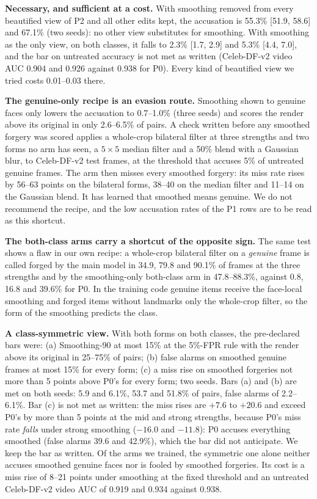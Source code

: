 \documentclass[conference]{IEEEtran}
\begin{document}
\textbf{Necessary, and sufficient at a cost.} With smoothing removed from every beautified view of P2 and all other
edits kept, the accusation is 55.3\% [51.9, 58.6] and 67.1\% (two seeds): no other view substitutes for smoothing. With
smoothing as the only view, on both classes, it falls to 2.3\% [1.7, 2.9] and 5.3\% [4.4, 7.0], and the bar on
untreated accuracy is not met as written (Celeb-DF-v2 video AUC 0.904 and 0.926 against 0.938 for P0). Every kind of
beautified view we tried costs 0.01--0.03 there.

\textbf{The genuine-only recipe is an evasion route.} Smoothing shown to genuine faces only lowers the accusation to
0.7--1.0\% (three seeds) and scores the render above its original in only 2.6--6.5\% of pairs. A check written before
any smoothed forgery was scored applies a whole-crop bilateral filter at three strengths and two forms no arm has seen,
a $5\times5$ median filter and a 50\% blend with a Gaussian blur, to Celeb-DF-v2 test frames, at the threshold that
accuses 5\% of untreated genuine frames. The arm then misses every smoothed forgery: its miss rate rises by 56--63
points on the bilateral forms, 38--40 on the median filter and 11--14 on the Gaussian blend. It has learned that
smoothed means genuine. We do not recommend the recipe, and the low accusation rates of the P1 rows are to be read as
this shortcut.

\textbf{The both-class arms carry a shortcut of the opposite sign.} The same test shows a flaw in our own recipe: a
whole-crop bilateral filter on a \emph{genuine} frame is called forged by the main model in 34.9, 79.8 and 90.1\% of
frames at the three strengths and by the smoothing-only both-class arm in 47.8--88.3\%, against 0.8, 16.8 and 39.6\%
for P0. In the training code genuine items receive the face-local smoothing and forged items without landmarks
only the whole-crop filter, so the form of the smoothing predicts the class.

\textbf{A class-symmetric view.} With both forms on both classes, the pre-declared bars were: (a) Smoothing-90 at most
15\% at the 5\%-FPR rule with the render above its original in 25--75\% of pairs; (b) false alarms on smoothed genuine
frames at most 15\% for every form; (c) a miss rise on smoothed forgeries not more than 5 points above P0's for every
form; two seeds. Bars (a) and (b) are met on both seeds: 5.9 and 6.1\%, 53.7 and 51.8\% of pairs, false alarms of
2.2--6.1\%. Bar (c) is not met as written: the miss rises are $+7.6$ to $+20.6$ and exceed P0's by more than 5 points
at the mid and strong strengths, because P0's miss rate \emph{falls} under strong smoothing ($-16.0$ and $-11.8$): P0
accuses everything smoothed (false alarms 39.6 and 42.9\%), which the bar did not anticipate. We keep the bar as
written. Of the arms we trained, the symmetric one alone neither accuses smoothed genuine faces nor is fooled by
smoothed forgeries. Its cost is a miss rise of 8--21 points under smoothing at the fixed threshold and an untreated
Celeb-DF-v2 video AUC of 0.919 and 0.934 against 0.938.
\end{document}
